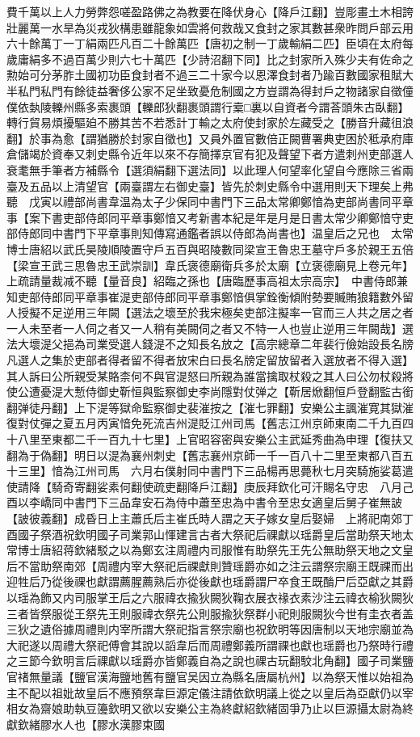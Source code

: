 費千萬以上人力勞弊怨嗟盈路佛之為教要在降伏身心【降戶江翻】豈彫畫土木相誇壯麗萬一水旱為災戎狄構患雖龍象如雲將何救哉又食封之家其數甚衆昨問戶部云用六十餘萬丁一丁絹兩匹凡百二十餘萬匹【唐初之制一丁歲輸絹二匹】臣頃在太府每歲庸絹多不過百萬少則六七十萬匹【少詩沼翻下同】比之封家所入殊少夫有佐命之勲始可分茅胙土國初功臣食封者不過三二十家今以恩澤食封者乃踰百數國家租賦大半私門私門有餘徒益奢侈公家不足坐致憂危制國之方豈謂為得封戶之物諸家自徵僮僕依埶陵轢州縣多索裹頭【轢郎狄翻裹頭謂行槖□裏以自資者今謂荅頭朱古臥翻】轉行貿易煩擾驅廹不勝其苦不若悉計丁輸之太府使封家於左藏受之【勝音升藏徂浪翻】於事為愈【謂猶勝於封家自徵也】又員外置官數倍正闕曹署典吏困於秪承府庫倉儲竭於資奉又刺史縣令近年以來不存簡擇京官有犯及聲望下者方遣刺州吏部選人衰耄無手筆者方補縣令【選須絹翻下選法同】以此理人何望率化望自今應除三省兩臺及五品以上清望官【兩臺謂左右御史臺】皆先於刺史縣令中選用則天下理矣上弗聽　戊寅以禮部尚書韋温為太子少保同中書門下三品太常卿鄭愔為吏部尚書同平章事【案下書吏部侍郎同平章事鄭愔又考新書本紀是年是月是日書太常少卿鄭愔守吏部侍郎同中書門下平章事則知傳寫通鑑者誤以侍郎為尚書也】温皇后之兄也　太常博士唐紹以武氏昊陵順陵置守戶五百與昭陵數同梁宣王魯忠王墓守戶多於親王五倍【梁宣王武三思魯忠王武崇訓】韋氏褒德廟衛兵多於太廟【立褒德廟見上卷元年】上疏請量裁减不聽【量音良】紹臨之孫也【唐臨歷事高祖太宗高宗】　中書侍郎兼知吏部侍郎同平章事崔湜吏部侍郎同平章事鄭愔俱掌銓衡傾附勢要贓賄狼籍數外留人授擬不足逆用三年闕【選法之壞至於我宋極矣吏部注擬率一官而三人共之居之者一人未至者一人伺之者又一人稍有美闕伺之者又不特一人也豈止逆用三年闕哉】選法大壞湜父挹為司業受選人錢湜不之知長名放之【高宗總章二年裴行儉始設長名牓凡選人之集於吏部者得者留不得者放宋白曰長名牓定留放留者入選放者不得入選】其人訴曰公所親受某賂柰何不與官湜怒曰所親為誰當擒取杖殺之其人曰公勿杖殺將使公遭憂湜大慙侍御史靳恒與監察御史李尚隱對仗弹之【靳居焮翻恒戶登翻監古銜翻弹徒丹翻】上下湜等獄命監察御史裴漼按之【漼七罪翻】安樂公主諷漼寛其獄漼復對仗彈之夏五月丙寅愔免死流吉州湜貶江州司馬【舊志江州京師東南二千九百四十八里至東都二千一百九十七里】上官昭容密與安樂公主武延秀曲為申理【復扶又翻為于偽翻】明日以湜為襄州刺史【舊志襄州京師一千一百八十二里至東都八百五十三里】愔為江州司馬　六月右僕射同中書門下三品楊再思薨秋七月突騎施娑葛遣使請降【騎奇寄翻娑素何翻使疏吏翻降戶江翻】庚辰拜欽化可汗賜名守忠　八月己酉以李嶠同中書門下三品韋安石為侍中蕭至忠為中書令至忠女適皇后舅子崔無詖【詖彼義翻】成昏日上主蕭氏后主崔氏時人謂之天子嫁女皇后娶婦　上將祀南郊丁酉國子祭酒祝欽明國子司業郭山惲建言古者大祭祀后祼獻以瑶爵皇后當助祭天地太常博士唐紹蒋欽緒駁之以為鄭玄注周禮内司服惟有助祭先王先公無助祭天地之文皇后不當助祭南郊【周禮内宰大祭祀后祼獻則贊瑶爵亦如之注云謂祭宗廟王既祼而出迎牲后乃從後祼也獻謂薦腥薦熟后亦從後獻也瑶爵謂尸卒食王既酳尸后亞獻之其爵以瑶為飾又内司服掌王后之六服禕衣揄狄闕狄鞠衣展衣禒衣素沙注云禕衣榆狄闕狄三者皆祭服從王祭先王則服禕衣祭先公則服揄狄祭群小祀則服闕狄今世有圭衣者盖三狄之遺俗據周禮則内宰所謂大祭祀指言祭宗廟也祝欽明等因唐制以天地宗廟並為大祀遂以周禮大祭祀傅會其說以謟韋后而周禮鄭義所謂祼也獻也瑶爵也乃祭時行禮之三節今欽明言后祼獻以瑶爵亦皆鄭義自為之說也祼古玩翻駮北角翻】國子司業鹽官禇無量議【鹽官漢海鹽地舊有鹽官吴因立為縣名唐屬杭州】以為祭天惟以始祖為主不配以祖妣故皇后不應預祭韋巨源定儀注請依欽明議上從之以皇后為亞獻仍以宰相女為齋娘助執豆籩欽明又欲以安樂公主為終獻紹欽緒固爭乃止以巨源攝太尉為終獻欽緒膠水人也【膠水漢膠束國